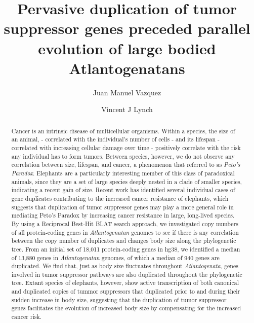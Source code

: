 \documentclass[]{elsarticle} %
\begin{document}
\begin{frontmatter}

  \title{Pervasive duplication of tumor suppressor genes preceded parallel
evolution of large bodied Atlantogenatans}
    \author[University of Chicago]{Juan Manuel Vazquez}
  
    \author[SUNY Buffalo]{Vincent J Lynch}
  
      \address[University of Chicago]{Department of Human Genetics, 920 East 58th St, Chicago, IL, 60637}
    \address[SUNY Buffalo]{Department of Biological Sciences, 551 Cooke Hall, Buffalo NY, 14260}
    
  \begin{abstract}
  Cancer is an intrinsic disease of multicellular organisms. Within a
  species, the size of an animal, - correlated with the individual's
  number of cells - and its lifespan - correlated with increasing cellular
  damage over time - positively correlate with the risk any individual has
  to form tumors. Between species, however, we do not observe any
  correlation between size, lifespan, and cancer, a phenomenon that
  referred to as \emph{Peto's Paradox}. Elephants are a particularly
  interesting member of this class of paradoxical animals, since they are
  a set of large species deeply nested in a clade of smaller species,
  indicating a recent gain of size. Recent work has identified several
  individual cases of gene duplicates contributing to the increased cancer
  resistance of elephants, which suggests that duplication of tumor
  suppressor genes may play a more general role in mediating Peto's
  Paradox by increasing cancer resistance in large, long-lived species. By
  using a Reciprocal Best-Hit BLAT search approach, we investigated copy
  numbers of all protein-coding genes in \emph{Atlantogenatan} genomes to
  see if there is any correlation between the copy number of duplicates
  and changes body size along the phylogenetic tree. From an initial set
  of 18,011 protein-coding genes in hg38, we identified a median of 13,880
  genes in \emph{Atlantogenatan} genomes, of which a median of 940 genes
  are duplicated. We find that, just as body size fluctuates throughout
  \emph{Atlantogenata}, genes involved in tumor suppressor pathways are
  also duplicated throughout the phylogenetic tree. Extant species of
  elephants, however, show active transcription of both canonical and
  duplicated copies of tummor suppressors that duplicated prior to and
  during their sudden increase in body size, suggesting that the
  duplication of tumor suppressor genes facilitates the evolution of
  increased body size by compensating for the increased cancer risk.
  \end{abstract}
  
 \end{frontmatter}
\end{document}
